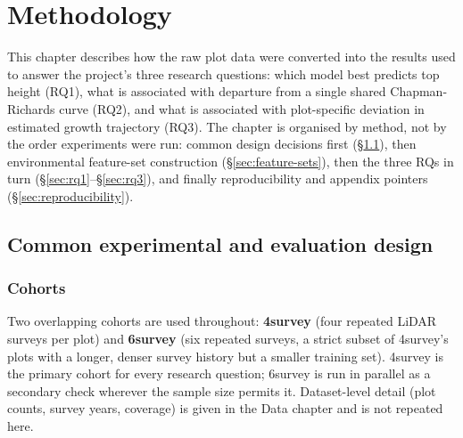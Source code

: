 
\chapter{Methodology}
\label{ch:methodology}

This chapter describes how the raw plot data were converted into the results used to answer the
project's three research questions: which model best predicts top height (RQ1), what is
associated with departure from a single shared Chapman-Richards curve (RQ2), and what is
associated with plot-specific deviation in estimated growth trajectory (RQ3). The chapter is
organised by method, not by the order experiments were run: common design decisions first
(\S\ref{sec:common-design}), then environmental feature-set construction
(\S\ref{sec:feature-sets}), then the three RQs in turn (\S\ref{sec:rq1}--\S\ref{sec:rq3}), and
finally reproducibility and appendix pointers (\S\ref{sec:reproducibility}).

\section{Common experimental and evaluation design}
\label{sec:common-design}

\subsection{Cohorts}

Two overlapping cohorts are used throughout: \textbf{4survey} (four repeated LiDAR
surveys per plot) and \textbf{6survey} (six repeated surveys, a strict subset of 4survey's plots
with a longer, denser survey history but a smaller training set). 4survey is the primary cohort
for every research question; 6survey is run in parallel as a secondary check wherever the sample
size permits it. Dataset-level detail (plot counts, survey years, coverage) is given in the Data
chapter and is not repeated here.

